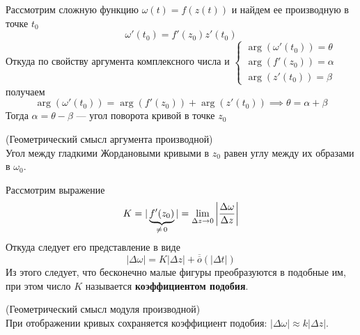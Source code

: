 	Рассмотрим сложную функцию $\omega(t) = f(z(t))$ и найдем ее производную в точке $t_0$
	\[ \omega'(t_0) = f'(z_0)z'(t_0) \]
	Откуда по свойству аргумента комплексного числа и 
	$\begin{cases} \arg(\omega'(t_0)) = \theta \\ 
		\arg (f'(z_0)) = \alpha \\ 
		\arg (z'(t_0)) = \beta 
	\end{cases}$ 
	получаем
	\[\arg(\omega'(t_0)) = \arg(f'(z_0)) + \arg(z'(t_0)) \implies\theta = \alpha + \beta \]
	Тогда $\alpha = \theta - \beta$ --- угол поворота кривой в точке $z_0$
	\begin{statement*}
		(Геометрический смысл аргумента производной)\\ \indent
		Угол между гладкими Жордановыми кривыми в $z_0$ равен углу между их образами в $\omega_0$.
	\end{statement*}
	Рассмотрим выражение 
	\[ K = |\underbrace{f'(z_0)}_{\mathclap{\neq\, 0}}| = \Lim_{\Delta z \to 0}\left|\frac{\Delta \omega}{\Delta z}\right| \]
	Откуда следует его представление в виде
	\[ |\Delta \omega | = K|\Delta z| + \overline{\overline{o}}(|\Delta t|) \]
	Из этого следует, что бесконечно малые фигуры преобразуются в подобные им, при этом число $K$ называется \textbf{коэффициентом подобия}.
	\begin{statement*}
		(Геометрический смысл модуля производной)\\ \indent
		При отображении кривых сохраняется коэффициент подобия: $|\Delta \omega| \approx k |\Delta z|$.
	\end{statement*}
	\newpage
